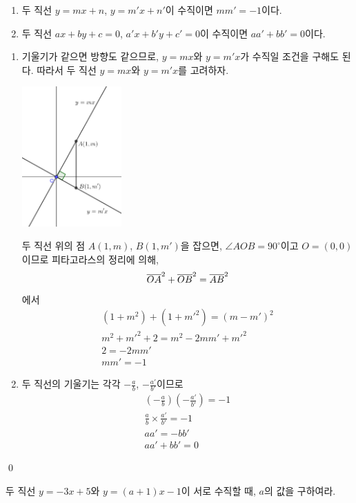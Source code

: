 \documentclass{oblivoir}
\begin{document}
\begin{mdframed}
\label{two9}
\begin{enumerate}
\item
두 직선 \(y=mx+n\), \(y=m'x+n'\)이 수직이면 \(mm'=-1\)이다.
\item
두 직선 \(ax+by+c=0\), \(a'x+b'y+c'=0\)이 수직이면 \(aa'+bb'=0\)이다.
\end{enumerate}
\end{mdframed}
\proo
\begin{enumerate}
\item
기울기가 같으면 방향도 같으므로, \(y=mx\)와 \(y=m'x\)가 수직일 조건을 구해도 된다.
따라서 두 직선 \(y=mx\)와 \(y=m'x\)를 고려하자.

\begin{center}
\includegraphics[width=0.3\textwidth]{twolines_8}
\end{center}

두 직선 위의 점 \(A(1,m)\), \(B(1,m')\)을 잡으면, \(\angle AOB=90^\circ\)이고 \(O=(0,0)\)이므로 피타고라스의 정리에 의해,
\[\overline{OA}^2+\overline{OB}^2=\overline{AB}^2\]
에서
\begin{gather*}
(1+m^2)+(1+m'^2)=(m-m')^2\\
m^2+m'^2+2=m^2-2mm'+m'^2\\
2=-2mm'\\
mm'=-1
\end{gather*}
\item
두 직선의 기울기는 각각
\(-\frac ab\), \(-\frac{a'}{b'}\)이므로%
\begin{gather*}
\left(-\frac ab\right)\left(-\frac{a'}{b'}\right)=-1\\
\frac ab\times\frac{a'}{b'}=-1\\
aa'=-bb'\\
aa'+bb'=0
\end{gather*}
\end{enumerate}
\qed

\prob{}\label{two10}
두 직선 \(y=-3x+5\)와 \(y=(a+1)x-1\)이 서로 수직할 때, \(a\)의 값을 구하여라.
\end{document}
